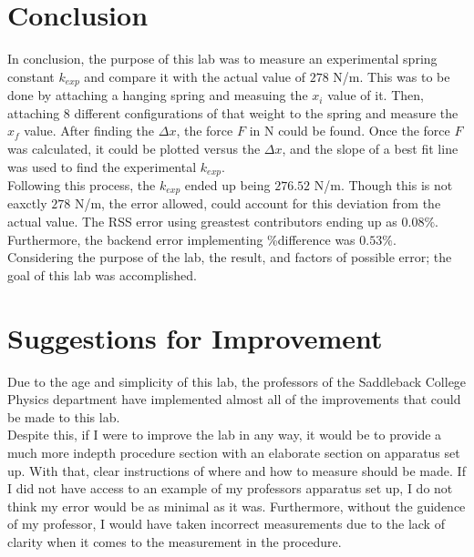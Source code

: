\begingroup
\let\clearpage\relax\chapter{Conclusion}

In conclusion, the purpose of this lab was to measure an experimental spring 
constant $k_{exp}$ and compare it with the actual value of $278$ N/m. This was to be done 
by attaching a hanging spring and measuing the $x_i$ value of it. Then, attaching
8 different configurations of that weight to the spring and measure the $x_f$
value. After finding the $\Delta x$, the force $F$ in N could be found.
Once the force $F$ was calculated, it could be plotted versus the $\Delta x$,
and the slope of a best fit line was used to find the experimental $k_{exp}$.\\

\noindent Following this process, the $k_{exp}$ ended up being $276.52$ N/m. Though this is not
eaxctly $278$ N/m, the error allowed, could account for this deviation from the actual
value. The RSS error using greastest contributors ending up as $0.08\%$.\\

\noindent Furthermore, the backend error implementing \%difference was $0.53\%$.\\

\noindent Considering the purpose of the lab, the result, and factors of possible error;
the goal of this lab was accomplished.

\chapter{Suggestions for Improvement}
\endgroup

\noindent Due to the age and simplicity of this lab, the professors
of the Saddleback College Physics department have implemented almost all of the
improvements that could be made to this lab.\\

\noindent Despite this, if I were to improve the lab in any way, it would be to 
provide a much more indepth procedure section with an elaborate section on 
apparatus set up. With that, clear instructions of where and how to measure
should be made. If I did not have access to an example of my professors 
apparatus set up, I do not think my error would be as minimal as it was. Furthermore,
without the guidence of my professor, I would have taken incorrect measurements due
to the lack of clarity when it comes to the measurement in the procedure.\\